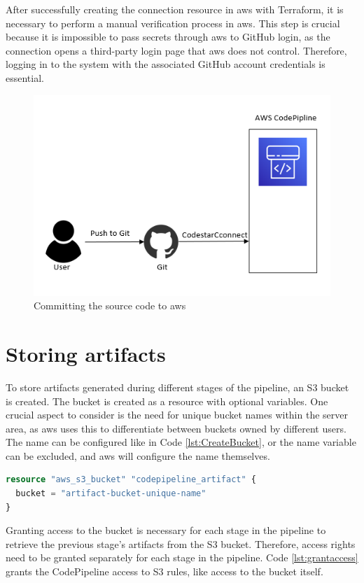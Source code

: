 After successfully creating the connection resource in \acrshort{aws} with Terraform, it is necessary to perform a manual verification process in \acrshort{aws}. This step is crucial because it is impossible to pass secrets through \acrshort{aws} to GitHub login, as the connection opens a third-party login page that \acrshort{aws} does not control. Therefore, logging in to the system with the associated GitHub account credentials is essential.

\vspace{2mm}
\begin{figure}[H]
    \centering
    \includegraphics[width=0.6\columnwidth]{Images/aws-piplin-2-1.png}
    \caption{Committing the source code to \acrshort{aws}}
    \label{fig: Committing the source code to AWS}
\end{figure}

\section{Storing artifacts}
To store \gls{artifact}s generated during different stages of the pipeline, an S3 bucket is created. The bucket is created as a resource with optional variables. One crucial aspect to consider is the need for unique bucket names within the server area, as \acrshort{aws} uses this to differentiate between buckets owned by different users. The name can be configured like in Code \ref{lst:CreateBucket}, or the name variable can be excluded, and \acrshort{aws} will configure the name themselves.

\vspace{2mm}
\begin{lstlisting}[language=terraform, caption=Create an S3 Bucket, captionpos=b, frame=single, label=lst:CreateBucket]
resource "aws_s3_bucket" "codepipeline_artifact" {
  bucket = "artifact-bucket-unique-name"
}
\end{lstlisting}

Granting access to the bucket is necessary for each stage in the pipeline to retrieve the previous stage's artifacts from the S3 bucket. Therefore, access rights need to be granted separately for each stage in the pipeline. Code \ref{lst:grantaccess} grants the CodePipeline access to S3 rules, like access to the bucket itself. 

